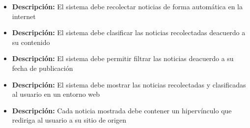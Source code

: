 
    \begin{itemize}
      \item \textbf{Descripción:} El sistema debe recolectar noticias de forma automática en la internet\\
    \end{itemize}
    \begin{itemize}
      \item \textbf{Descripción:} El sistema debe clasificar las noticias recolectadas deacuerdo a su contenido\\
    \end{itemize}
    \begin{itemize}
      \item \textbf{Descripción:} El sistema debe permitir filtrar las noticias deacuerdo a su fecha de publicación\\
    \end{itemize}
    \begin{itemize}
      \item \textbf{Descripción:} El sistema debe mostrar las noticias recolectadas y clasificadas al usuario en un entorno web\\
    \end{itemize}
    \begin{itemize}
      \item \textbf{Descripción:} Cada noticia mostrada debe contener un hipervínculo que rediriga al usuario a su sitio de origen\\
    \end{itemize}


